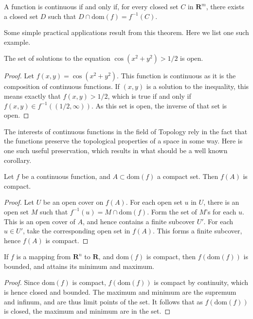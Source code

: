 \begin{corollary}
  A function is continuous if and only if, for every closed set $C$ in $\mathbf{R}^m$, there exists a closed set $D$ such that $D \cap \text{dom}(f) = f^{-1}(C)$.
\end{corollary}

Some simple practical applications result from this theorem. Here we list one such example.

\begin{lemma}
  The set of solutions to the equation $\cos(x^2 + y^2) > 1/2$ is open.
\end{lemma}
\begin{proof}
  Let $f(x,y) = \cos(x^2 + y^2)$. This function is continuous as it is the composition of continuous functions. If $(x,y)$ is a solution to the inequality, this means exactly that $f(x,y) > 1/2$, which is true if and only if $f(x,y) \in f^{-1}((1/2, \infty))$. As this set is open, the inverse of that set is open.
\end{proof}

The interests of continuous functions in the field of Topology rely in the fact that the functions preserve the topological properties of a space in some way. Here is one such useful preservation, which results in what should be a well known corollary.

\begin{theorem}
  Let $f$ be a continuous function, and $A \subset \text{dom}(f)$ a compact set. Then $f(A)$ is compact.
\end{theorem}
\begin{proof}
  Let $U$ be an open cover on $f(A)$. For each open set $u$ in $U$, there is an open set $M$ such that $f^{-1}(u) = M \cap \text{dom}(f)$. Form the set of $M$'s for each $u$. This is an open cover of $A$, and hence contains a finite subcover $U'$. For each $u \in U'$, take the corresponding open set in $f(A)$. This forms a finite subcover, hence $f(A)$ is compact.
\end{proof}

\begin{corollary}
  If $f$ is a mapping from $\mathbf{R}^n$ to $\mathbf{R}$, and $\text{dom}(f)$ is compact, then $f(\text{dom}(f))$ is bounded, and attains its minimum and maximum.
\end{corollary}
\begin{proof}
  Since $\text{dom}(f)$ is compact, $f(\text{dom}(f))$ is compact by continuity, which is hence closed and bounded. The maximum and minimum are the supremum and infinum, and are thus limit points of the set. It follows that as $f(\text{dom}(f))$ is closed, the maximum and minimum are in the set.
\end{proof}


